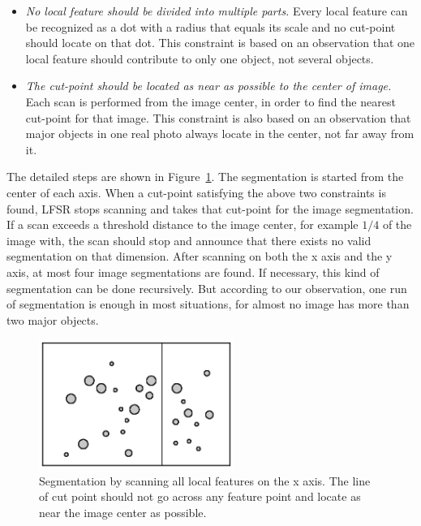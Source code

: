 \begin{itemize}

  \item \textit{No local feature should be divided into multiple parts.} Every local feature can be recognized as a dot with a radius that equals its scale and no cut-point should locate on that dot. This constraint is based on an observation that one local feature should contribute to only one object, not several objects.

  \item \textit{The cut-point should be located as near as possible to the center of image.} Each scan is performed from the image center, in order to find the nearest cut-point for that image. This constraint is also based on an observation that major objects in one real photo always locate in the center, not far away from it.

\end{itemize}

The detailed steps are shown in Figure~\ref{fig:segmentation}. The segmentation is started from the center of each axis. When a cut-point satisfying the above two constraints is found, LFSR stops scanning and takes that cut-point for the image segmentation. If a scan exceeds a threshold distance to the image center, for example $1/4$ of the image with, the scan should stop and announce that there exists no valid segmentation on that dimension. After scanning on both the x axis and the y axis, at most four image segmentations are found. If necessary, this kind of segmentation can be done recursively. But according to our observation, one run of segmentation is enough in most situations, for almost no image has more than two major objects.

\begin{figure}[!t]
\centering
\includegraphics[width=2.5in]{images/fig-segmentation.eps}
\caption{Segmentation by scanning all local features on the x axis. The line of cut point should not go across any feature point and locate as near the image center as possible.}
\label{fig:segmentation}
\end{figure}

